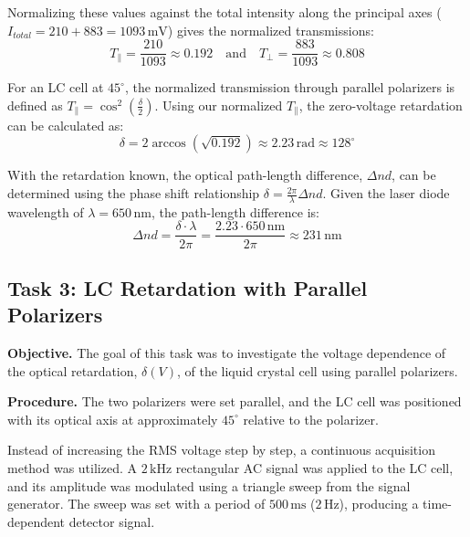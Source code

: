 \documentclass[12pt,a4paper]{article}
\begin{document}
Normalizing these values against the total intensity along the principal axes (\(I_{total} = 210 + 883 = 1093\,\mathrm{mV}\)) gives the normalized transmissions:
\begin{equation}
T_{\parallel} = \frac{210}{1093} \approx 0.192 \quad \text{and} \quad T_{\perp} = \frac{883}{1093} \approx 0.808
\end{equation}

For an LC cell at \(45^\circ\), the normalized transmission through parallel polarizers is defined as \(T_{\parallel} = \cos^2\left(\frac{\delta}{2}\right)\). Using our normalized \(T_{\parallel}\), the zero-voltage retardation can be calculated as:
\begin{equation}
\delta = 2 \arccos\left(\sqrt{0.192}\right) \approx 2.23\,\mathrm{rad} \approx 128^\circ
\end{equation}

With the retardation known, the optical path-length difference, \(\Delta n d\), can be determined using the phase shift relationship \(\delta = \frac{2\pi}{\lambda} \Delta n d\). Given the laser diode wavelength of \(\lambda = 650\,\mathrm{nm}\), the path-length difference is:
\begin{equation}
\Delta n d = \frac{\delta \cdot \lambda}{2\pi} = \frac{2.23 \cdot 650\,\mathrm{nm}}{2\pi} \approx 231\,\mathrm{nm}
\end{equation}











\subsection{Task 3: LC Retardation with Parallel Polarizers}

\textbf{Objective.}
The goal of this task was to investigate the voltage dependence of the optical retardation, \(\delta(V)\), of the liquid crystal cell using parallel polarizers.

\textbf{Procedure.}
The two polarizers were set parallel, and the LC cell was positioned with its optical axis at approximately \(45^\circ\) relative to the polarizer. 

Instead of increasing the RMS voltage step by step, a continuous acquisition method was utilized. A \(2\,\mathrm{kHz}\) rectangular AC signal was applied to the LC cell, and its amplitude was modulated using a triangle sweep from the signal generator. The sweep was set with a period of \(500\,\mathrm{ms}\) (\(2\,\mathrm{Hz}\)), producing a time-dependent detector signal. 
\end{document}
